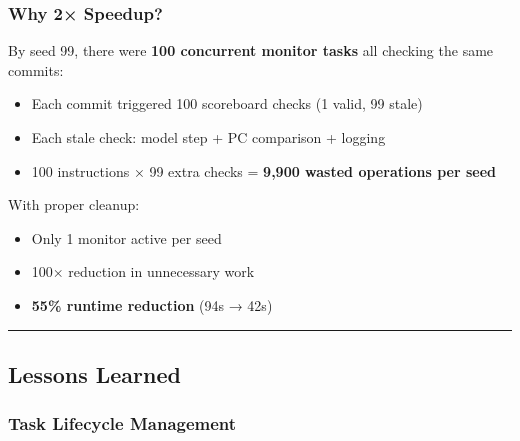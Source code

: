 \subsubsection{Why 2× Speedup?}\label{cr:fix:pc-mismatch-fix:why-2-speedup}

\begin{record}

By seed 99, there were \textbf{100 concurrent monitor tasks} all
checking the same commits:

\begin{itemize}
\tightlist
\item
  Each commit triggered 100 scoreboard checks (1 valid, 99 stale)
\item
  Each stale check: model step + PC comparison + logging
\item
  100 instructions × 99 extra checks = \textbf{9,900 wasted operations
  per seed}
\end{itemize}

With proper cleanup:

\begin{itemize}
\tightlist
\item
  Only 1 monitor active per seed
\item
  100× reduction in unnecessary work
\item
  \textbf{55\% runtime reduction} (94s → 42s)
\end{itemize}

\begin{center}\rule{0.5\linewidth}{0.5pt}\end{center}

\end{record}

\subsection{Lessons Learned}\label{cr:fix:pc-mismatch-fix:lessons-learned}

\subsubsection{Task Lifecycle Management}\label{cr:fix:pc-mismatch-fix:task-lifecycle-management}


